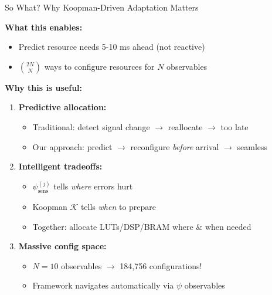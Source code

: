 \documentclass[aspectratio=169,11pt]{beamer}
\begin{document}
\begin{frame}{So What? Why Koopman-Driven Adaptation Matters}

\textbf{What this enables:}
\begin{itemize}
    \item Predict resource needs 5-10 ms ahead (not reactive)
    \item $\binom{2N}{N}$ ways to configure resources for $N$ observables
\end{itemize}

\vspace{0.3cm}

\textbf{Why this is useful:}
\begin{enumerate}
    \item \textbf{Predictive allocation:}
    \begin{itemize}
        \item Traditional: detect signal change $\rightarrow$ reallocate $\rightarrow$ too late
        \item Our approach: predict $\rightarrow$ reconfigure \emph{before} arrival $\rightarrow$ seamless
    \end{itemize}
    
    \vspace{0.15cm}
    
    \item \textbf{Intelligent tradeoffs:}
    \begin{itemize}
        \item $\psi_{\text{sens}}^{(j)}$ tells \emph{where} errors hurt
        \item Koopman $\mathcal{K}$ tells \emph{when} to prepare
        \item Together: allocate LUTs/DSP/BRAM where \& when needed
    \end{itemize}
    
    \vspace{0.15cm}
    
    \item \textbf{Massive config space:}
    \begin{itemize}
        \item $N=10$ observables $\rightarrow$ 184,756 configurations!
        \item Framework navigates automatically via $\psi$ observables
    \end{itemize}
\end{enumerate}

\end{frame}
\end{document}
